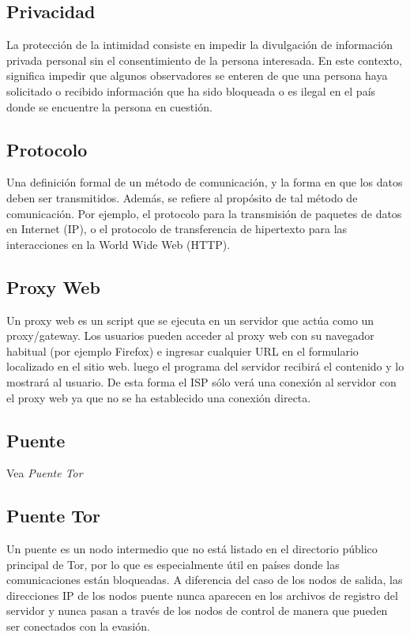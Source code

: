 \subsection{Privacidad}\label{privacidad}

La protección de la intimidad consiste en impedir la divulgación de
información privada personal sin el consentimiento de la persona
interesada. En este contexto, significa impedir que algunos observadores
se enteren de que una persona haya solicitado o recibido información que
ha sido bloqueada o es ilegal en el país donde se encuentre la persona
en cuestión.

\subsection{Protocolo}\label{protocolo}

Una definición formal de un método de comunicación, y la forma en que
los datos deben ser transmitidos. Además, se refiere al propósito de tal
método de comunicación. Por ejemplo, el protocolo para la transmisión de
paquetes de datos en Internet (IP), o el protocolo de transferencia de
hipertexto para las interacciones en la World Wide Web (HTTP).

\subsection{Proxy Web}\label{proxy-web}

Un proxy web es un script que se ejecuta en un servidor que actúa como
un proxy/gateway. Los usuarios pueden acceder al proxy web con su
navegador habitual (por ejemplo Firefox) e ingresar cualquier URL en el
formulario localizado en el sitio web. luego el programa del servidor
recibirá el contenido y lo mostrará al usuario. De esta forma el ISP
sólo verá una conexión al servidor con el proxy web ya que no se ha
establecido una conexión directa.

\subsection{Puente}\label{puente}

Vea \emph{Puente Tor}

\subsection{Puente Tor}\label{puente-tor}

Un puente es un nodo intermedio que no está listado en el directorio
público principal de Tor, por lo que es especialmente útil en países
donde las comunicaciones están bloqueadas. A diferencia del caso de los
nodos de salida, las direcciones IP de los nodos puente nunca aparecen
en los archivos de registro del servidor y nunca pasan a través de los
nodos de control de manera que pueden ser conectados con la evasión.

